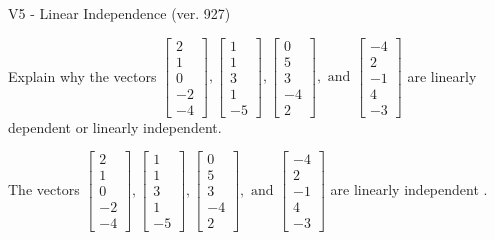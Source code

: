 \begin{exercise}
  \begin{exerciseTitle}V5 - Linear Independence (ver. 927)\end{exerciseTitle}
  \begin{exerciseStatement}
    Explain why the vectors \(\left[\begin{array}{r}
2 \\
1 \\
0 \\
-2 \\
-4
\end{array}\right] , \left[\begin{array}{r}
1 \\
1 \\
3 \\
1 \\
-5
\end{array}\right] , \left[\begin{array}{r}
0 \\
5 \\
3 \\
-4 \\
2
\end{array}\right] , \text{ and } \left[\begin{array}{r}
-4 \\
2 \\
-1 \\
4 \\
-3
\end{array}\right]\) are linearly dependent or linearly independent.	


  \end{exerciseStatement}
  \begin{exerciseAnswer}
   The vectors \(\left[\begin{array}{r}
2 \\
1 \\
0 \\
-2 \\
-4
\end{array}\right] , \left[\begin{array}{r}
1 \\
1 \\
3 \\
1 \\
-5
\end{array}\right] , \left[\begin{array}{r}
0 \\
5 \\
3 \\
-4 \\
2
\end{array}\right] , \text{ and } \left[\begin{array}{r}
-4 \\
2 \\
-1 \\
4 \\
-3
\end{array}\right]\) are 
  	 linearly independent  .
  


  \end{exerciseAnswer}
\end{exercise}